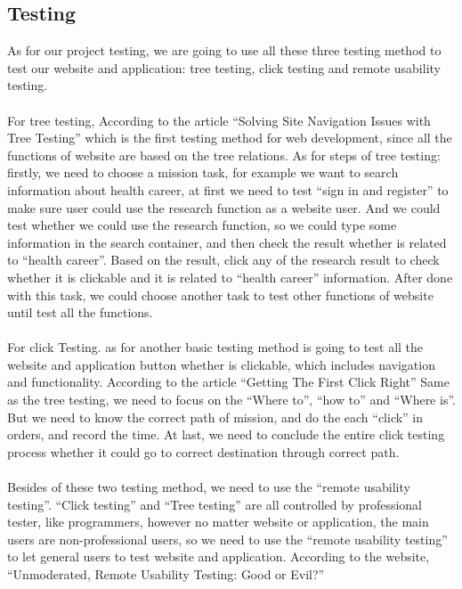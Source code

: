 \documentclass[letterpaper,10pt, draftclsnofoot,onecolumn]{IEEEtran}
\begin{document}
{{\subsection[Testing]{\noindent\color{black}
Testing}

\noindent As for our project testing, we are going to use all these three testing method to test our website and application: tree testing, click testing and remote usability testing. 
\\ \\
\noindent For tree testing, According to the article “Solving Site Navigation Issues with Tree Testing” \cite{article4}which is the first testing method for web development, since all the functions of website are based on the tree relations. As for steps of tree testing: firstly, we need to choose a mission task, for example we want to search information about health career, at first we need to test “sign in and register” to make sure user could use the research function as a website user. And we could test whether we could use the research function, so we could type some information in the search container, and then check the result whether is related to “health career”. Based on the result, click any of the research result to check whether it is clickable and it is related to “health career” information. After done with this task, we could choose another task to test other functions of website until test all the functions.
\\ \\
\noindent For click Testing. as for another basic testing method is going to test all the website and application button whether is clickable, which includes navigation and functionality. According to the article “Getting The First Click Right” \cite{article5}Same as the tree testing, we need to focus on the “Where to”, “how to” and “Where is”. But we need to know the correct path of mission, and do the each “click” in orders, and record the time. At last, we need to conclude the entire click testing process whether it could go to correct destination through correct path.
\\ \\
\noindent Besides of these two testing method, we need to  use the “remote usability testing”. “Click testing” and “Tree testing” are all controlled by professional tester, like programmers, however no matter website or application, the main users are non-professional users, so we need to use the “remote usability testing” to let general users to test website and application. According to the website, “Unmoderated, Remote Usability Testing: Good or Evil?” \cite{article6}
}}
\end{document}
